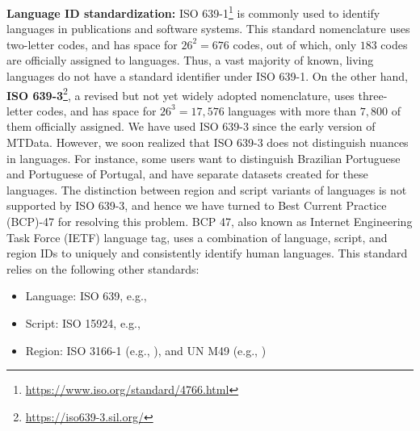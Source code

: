 \textbf{Language ID standardization:} ISO 639-1\footnote{\url{https://www.iso.org/standard/4766.html}} is commonly used to identify languages in publications and software systems.  
This standard nomenclature uses two-letter codes, and has space for $26^2 = 676$ codes, out of which, only $183$ codes are officially assigned to languages. Thus, a vast majority of known, living languages do not have a standard identifier under ISO 639-1. 
On the other hand, \textbf{ISO 639-3}\footnote{\url{https://iso639-3.sil.org/}}, a revised but not yet widely adopted nomenclature, uses three-letter codes, and has space for $26^3 = 17,576$ languages with more than $7,800$ of them officially assigned. We have used ISO 639-3 since the early version of MTData.
However, we soon realized that ISO 639-3 does not distinguish nuances in languages. For instance, some users want to distinguish Brazilian Portuguese and Portuguese of Portugal, and have separate datasets created for these languages. 
The distinction between region and script variants of languages is not supported by ISO 639-3, and hence we have turned to Best Current Practice (BCP)-47 \cite{phillips2009bcp47} for resolving this problem.
BCP 47, also known as Internet Engineering Task Force (IETF) language tag, uses a combination of language, script, and region IDs to uniquely and consistently identify human languages.
This standard relies on the following other standards:
\begin{itemize}
    \item Language: ISO 639, e.g., 
    \item Script: ISO 15924, e.g., 
    \item Region: ISO 3166-1  (e.g., ), and UN M49 (e.g., )
\end{itemize}

